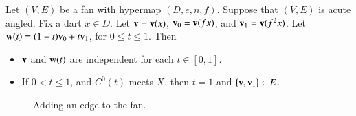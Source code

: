 \begin{lemma}[sweep]\label{lemma:sweep}  
Let $(V,E)$ be a fan with hypermap $(D,e,n,f)$.  
Suppose that $(V,E)$ is acute angled. Fix a dart $x\in D$.
Let ${\mathbf v} = {\mathbf v}(x)$, ${\mathbf v}_0 = {\mathbf v}(f x)$,
and ${\mathbf v}_1 = {\mathbf v}(f^2 x)$.  Let ${\mathbf w}(t) = (1-t) {\mathbf v}_0 + t {\mathbf v}_1$, for
$0\le t\le 1$.  Then
\begin{itemize}
\item ${\mathbf v}$ and ${\mathbf w}(t)$ are independent for each $t\in[0,1]$.
\item If $0 < t \le 1$, and $C^0(t)$ meets $X$, then $t=1$ and $\{{\mathbf v},{\mathbf v}_1\}\in E$.
\end{itemize}
\end{lemma}


\begin{figure}[htb]
  \centering
  \caption{Adding an edge to the fan.}
  \label{fig:vt}
\end{figure}


